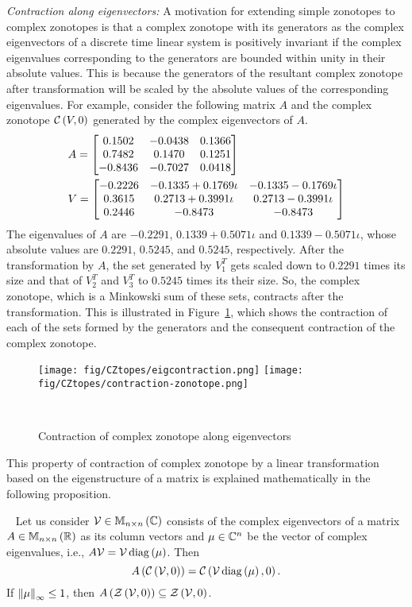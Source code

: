 \emph{Contraction along eigenvectors:  }  A motivation for extending
simple zonotopes to complex zonotopes is that a complex zonotope with
its generators as the complex eigenvectors of a discrete time linear
system is positively invariant if the complex eigenvalues
corresponding to the generators are bounded within unity in their
absolute values.  This is because the generators of the resultant
complex zonotope after transformation will be scaled by the absolute
values of the corresponding eigenvalues.  For example, consider the
following matrix $A$ and the complex zonotope
$\mathit{\mathcal{C}}\left(V,0\right)$ generated by the complex eigenvectors of $A$.
%
\begin{align*}
& A=\left[\begin{matrix}
0.1502 &  -0.0438  &  0.1366\\
    0.7482 &   0.1470  &  0.1251\\
   -0.8436 &  -0.7027  &  0.0418
\end{matrix}\right]\\
& V=\left[\begin{matrix}
-0.2226  &  -0.1335 + 0.1769\iota &  -0.1335 - 0.1769\iota\\
   0.3615 &   0.2713 + 0.3991\iota &  0.2713 - 0.3991\iota\\
   0.2446 & -0.8473 &   -0.8473 
\end{matrix}\right]
\end{align*}
%
The eigenvalues of $A$ are $-0.2291$, $0.1339 + 0.5071\iota$ and
${0.1339 - 0.5071\iota}$, whose absolute values are $0.2291$,
$0.5245$, and $0.5245$, respectively.  After the transformation by
$A$, the set generated by $V^T_1$ gets scaled down to $0.2291$ times
its size and that of $V^T_2$ and $V^T_3$ to $0.5245$ times
its their size.  So, the complex zonotope, which is a Minkowski sum
of these sets, contracts after the transformation.  This is illustrated
in Figure~\ref{fig:cz-scaled-down}, which shows the contraction of
each of the sets formed by the generators and the consequent
contraction of the complex zonotope.
%
\begin{figure}
\center
\texttt{[image: fig/CZtopes/eigcontraction.png]}
\texttt{[image: fig/CZtopes/contraction-zonotope.png]}
\caption{Contraction of complex zonotope along
eigenvectors}~\label{fig:cz-scaled-down}
\end{figure}
%
This property of contraction of complex zonotope by a linear
transformation based on the eigenstructure of a matrix is explained
mathematically in the following proposition.
%
\begin{proposition}~\label{lem:eig-invariance}
Let us consider $\mathcal{V}\in\mathbb{M}_{n\times n}\left(\mathbb{C}\right)$ consists of the
complex eigenvectors of a matrix $A\in\mathbb{M}_{n\times n}\left(\mathbb{R}\right)$ as its
column vectors and $\mu\in\mathbb{C}^n$ be the vector of complex
eigenvalues, i.e., $A\mathcal{V} = \mathcal{V}\operatorname{diag}\left(\mu\right)$.
Then \[A\left(\mathit{\mathcal{C}}\left(\mathcal{V},0\right)\right)
= \mathit{\mathcal{C}}\left(\mathcal{V}\operatorname{diag}\left({\mu}\right),0\right).\]  If
$\left\|\mu\right\|_{\infty}\leq 1$, then
$A\left(\mathit{\mathcal{Z}}\left(\mathcal{V},0\right)\right)\subseteq \mathit{\mathcal{Z}}\left(\mathcal{V},0\right)$.
\end{proposition}
